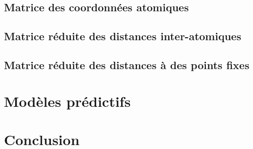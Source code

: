 \documentclass{report}
\begin{document}
	\section{Matrice des coordonnées atomiques}
		

	\section{Matrice réduite des distances inter-atomiques}
		
		
	\section{Matrice réduite des distances à des points fixes}
		
	\section{}

\chapter{Modèles prédictifs}

\chapter{Conclusion}
	
	

\addappheadtotoc
\appendixpage

\appendix
\end{document}
